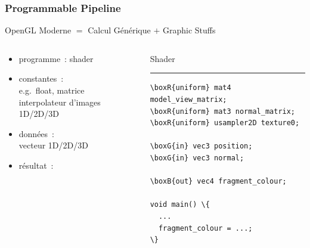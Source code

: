 \begin{frame}[fragile]
  \frametitle{Programmable Pipeline}
  \begin{center}
    OpenGL Moderne $=$ Calcul Générique $+$ Graphic Stuffs
  \end{center}
  \begin{columns}
    \begin{column}{.5\textwidth}
      \begin{itemize}
      \item programme~: shader
      \item constantes~:  \\
        e.g.\ float, matrice \\
        interpolateur d'images 1D/2D/3D
      \item données~:  \\
        vecteur 1D/2D/3D
      \item résultat~: 
      \end{itemize}
    \end{column}
    \begin{column}{.4\textwidth}
      \begin{center}
        Shader
        \rule{\textwidth}{1pt}
{\scriptsize
\begin{Verbatim}[commandchars=\\\{\}]
\boxR{uniform} mat4 model_view_matrix;
\boxR{uniform} mat3 normal_matrix;
\boxR{uniform} usampler2D texture0;

\boxG{in} vec3 position;
\boxG{in} vec3 normal;

\boxB{out} vec4 fragment_colour;

void main() \{
  ...
  fragment_colour = ...;
\}
\end{Verbatim}
}
      \end{center}
    \end{column}
  \end{columns}
\end{frame}

